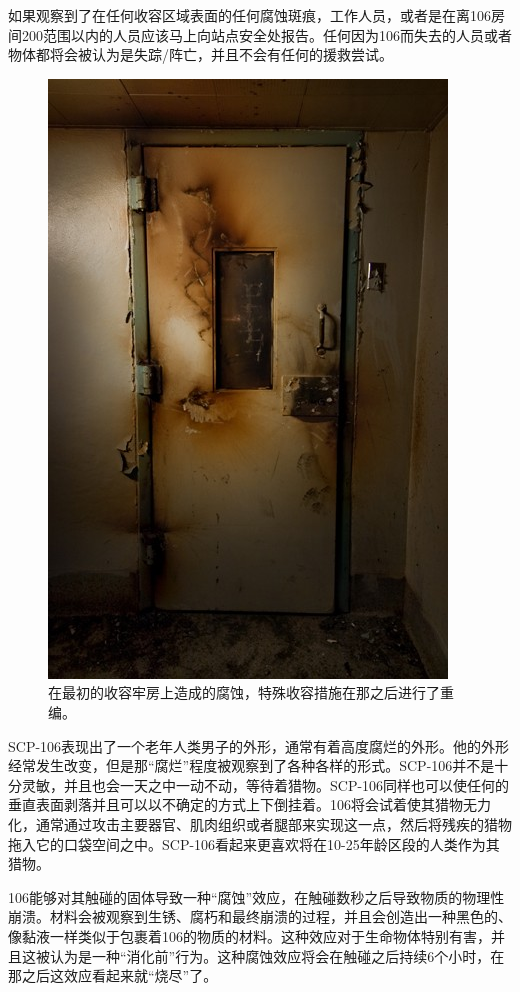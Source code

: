 如果观察到了在任何收容区域表面的任何腐蚀斑痕，工作人员，或者是在离106房间200范围以内的人员应该马上向站点安全处报告。任何因为106而失去的人员或者物体都将会被认为是失踪\slash 阵亡，并且不会有任何的援救尝试。




\begin{figure}[H]
    \centering
    \includegraphics[width=0.5\linewidth]{images/SCP.106.2.jpg}
    \caption*{在最初的收容牢房上造成的腐蚀，特殊收容措施在那之后进行了重编。}
\end{figure}

SCP-106表现出了一个老年人类男子的外形，通常有着高度腐烂的外形。他的外形经常发生改变，但是那“腐烂”程度被观察到了各种各样的形式。SCP-106并不是十分灵敏，并且也会一天之中一动不动，等待着猎物。SCP-106同样也可以使任何的垂直表面剥落并且可以以不确定的方式上下倒挂着。106将会试着使其猎物无力化，通常通过攻击主要器官、肌肉组织或者腿部来实现这一点，然后将残疾的猎物拖入它的口袋空间之中。SCP-106看起来更喜欢将在10-25年龄区段的人类作为其猎物。

106能够对其触碰的固体导致一种“腐蚀”效应，在触碰数秒之后导致物质的物理性崩溃。材料会被观察到生锈、腐朽和最终崩溃的过程，并且会创造出一种黑色的、像黏液一样类似于包裹着106的物质的材料。这种效应对于生命物体特别有害，并且这被认为是一种“消化前”行为。这种腐蚀效应将会在触碰之后持续6个小时，在那之后这效应看起来就“烧尽”了。

